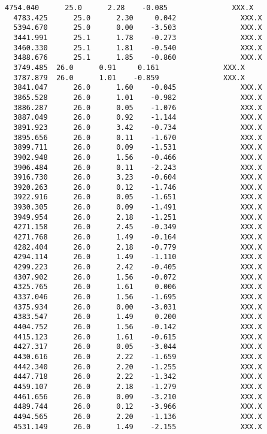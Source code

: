 \documentclass[11pt]{article}
\begin{document}
\begin{Verbatim}[commandchars=\\\{\}]
  4754.040      25.0      2.28    -0.085               XXX.X
  4783.425      25.0      2.30     0.042               XXX.X
  5394.670      25.0      0.00    -3.503               XXX.X
  3441.991      25.1      1.78    -0.273               XXX.X
  3460.330      25.1      1.81    -0.540               XXX.X
  3488.676      25.1      1.85    -0.860               XXX.X
  3749.485	26.0	  0.91     0.161               XXX.X
  3787.879	26.0	  1.01    -0.859               XXX.X
  3841.047      26.0      1.60    -0.045               XXX.X
  3865.528      26.0      1.01    -0.982               XXX.X
  3886.287      26.0      0.05    -1.076               XXX.X
  3887.049      26.0      0.92    -1.144               XXX.X
  3891.923      26.0      3.42    -0.734               XXX.X
  3895.656      26.0      0.11    -1.670               XXX.X
  3899.711      26.0      0.09    -1.531               XXX.X
  3902.948      26.0      1.56    -0.466               XXX.X
  3906.484      26.0      0.11    -2.243               XXX.X
  3916.730      26.0      3.23    -0.604               XXX.X
  3920.263      26.0      0.12    -1.746               XXX.X
  3922.916      26.0      0.05    -1.651               XXX.X
  3930.305      26.0      0.09    -1.491               XXX.X
  3949.954      26.0      2.18    -1.251               XXX.X
  4271.158      26.0      2.45    -0.349               XXX.X
  4271.768      26.0      1.49    -0.164               XXX.X
  4282.404      26.0      2.18    -0.779               XXX.X
  4294.114      26.0      1.49    -1.110               XXX.X
  4299.223      26.0      2.42    -0.405               XXX.X
  4307.902      26.0      1.56    -0.072               XXX.X
  4325.765      26.0      1.61     0.006               XXX.X
  4337.046      26.0      1.56    -1.695               XXX.X
  4375.934      26.0      0.00    -3.031               XXX.X
  4383.547      26.0      1.49     0.200               XXX.X
  4404.752      26.0      1.56    -0.142               XXX.X
  4415.123      26.0      1.61    -0.615               XXX.X
  4427.317      26.0      0.05    -3.044               XXX.X
  4430.616      26.0      2.22    -1.659               XXX.X
  4442.340      26.0      2.20    -1.255               XXX.X
  4447.718      26.0      2.22    -1.342               XXX.X
  4459.107      26.0      2.18    -1.279               XXX.X
  4461.656      26.0      0.09    -3.210               XXX.X
  4489.744      26.0      0.12    -3.966               XXX.X
  4494.565      26.0      2.20    -1.136               XXX.X
  4531.149      26.0      1.49    -2.155               XXX.X

\end{Verbatim}
\end{document}
